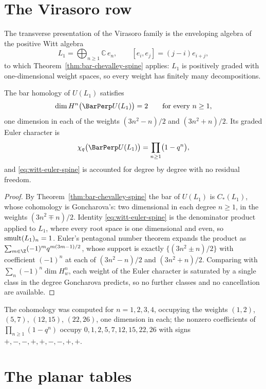 \section{The Virasoro row}

The transverse presentation of the Virasoro family is the enveloping algebra of
the positive Witt algebra
\[
 L_1=\bigoplus_{n\ge1}\mathbb C\,e_n,
 \qquad
 [e_i,e_j]=(j-i)e_{i+j},
\]
to which Theorem~\ref{thm:bar-chevalley-spine} applies: $L_1$ is positively
graded with one-dimensional weight spaces, so every weight has finitely many
decompositions.

\begin{theorem}
\label{thm:pentagonal-spine}
The bar homology of $U(L_1)$ satisfies
\[
 \dim H^n\bigl(\BarPerp U(L_1)\bigr)=2
 \qquad\text{for every }n\ge1,
\]
one dimension in each of the weights $(3n^2-n)/2$ and $(3n^2+n)/2$. Its graded
Euler character is
\begin{equation}
\label{eq:witt-euler-spine}
 \chi_q\bigl(\BarPerp U(L_1)\bigr)=\prod_{n\ge1}\bigl(1-q^n\bigr),
\end{equation}
and \eqref{eq:witt-euler-spine} is accounted for degree by degree with no
residual freedom.
\end{theorem}
\begin{proof}
By Theorem~\ref{thm:bar-chevalley-spine} the bar of $U(L_1)$ is $C_*(L_1)$,
whose cohomology is Goncharova's: two dimensional in each degree $n\ge1$, in
the weights $(3n^2\mp n)/2$. Identity \eqref{eq:witt-euler-spine} is the
denominator product applied to $L_1$, where every root space is one dimensional
and even, so $\operatorname{smult}(L_1)_n=1$. Euler's pentagonal number theorem expands the
product as $\sum_{m\in\Z}(-1)^mq^{m(3m-1)/2}$, whose support is exactly
$\{(3n^2\pm n)/2\}$ with coefficient $(-1)^n$ at each of $(3n^2-n)/2$ and
$(3n^2+n)/2$. Comparing with $\sum_n(-1)^n\dim H^n_w$, each weight of the Euler
character is saturated by a single class in the degree Goncharova predicts, so
no further classes and no cancellation are available.
\end{proof}

The cohomology was computed for $n=1,2,3,4$, occupying the weights $(1,2)$,
$(5,7)$, $(12,15)$, $(22,26)$, one dimension in each; the nonzero coefficients
of $\prod_{n\ge1}(1-q^n)$ occupy $0,1,2,5,7,12,15,22,26$ with signs
$+,-,-,+,+,-,-,+,+$.

\section{The planar tables}

